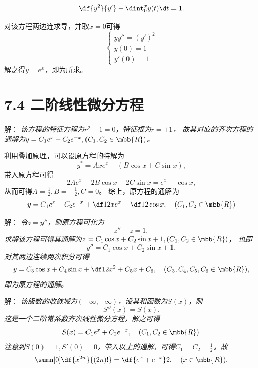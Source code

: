 \begin{frame}
	\linespread{1.5}	
	\small \it
	$$\df{y^2}{y'}-\dint_0^xy(t)\d t=1.$$
	
	对该方程两边连求导，并取$x=0$可得
	$$\left\{\begin{array}{l}
	yy''=(y')^2\\
	y(0)=1\\
	y'(0)=1
	\end{array}\right.$$
	解之得$y=e^x$，即为所求。
	\fin
\end{frame}

\section{7.4 二阶线性微分方程}

\begin{frame}
	\linespread{1.5}
	
	\bigskip
	
	\small 解：\it
	该方程的特征方程为$r^2-1=0$，特征根为$r=\pm1$，
	故其对应的齐次方程的通解为$y=C_1e^x+C_2e^{-x},(C_1,C_2\in\mbb{R})$。
	
	利用叠加原理，可以设原方程的特解为
	$$y^*=Axe^x+(B\cos x+C\sin x),$$
	带入原方程可得
	$$2Ae^x-2B\cos x-2C\sin x=e^x+\cos x,$$
	从而可得$A=\frac12,B=-\frac12,C=0$。
	综上，原方程的通解为
	$$y=C_1e^x+C_2e^{-x}+\df12xe^x-\df12\cos x,\quad (C_1,C_2\in\mbb{R})$$
\end{frame}

\begin{frame}
	\linespread{1.5}
	
	\bigskip
	
	\small 解：\it
	令$z=y''$，则原方程可化为
	$$z''+z=1,$$
	求解该方程可得其通解为$z=C_1\cos x+C_2\sin x+1,(C_1,C_2\in\mbb{R})$，
	也即
	$$y''=C_1\cos x+C_2\sin x+1,$$
	对其两边连续两次积分可得
	$$y=C_3\cos x+C_4\sin x+\df12x^2+C_5x+C_6,\quad (C_3,C_4,C_5,C_6\in\mbb{R}),$$
	即为原方程的通解。\fin
\end{frame}

\begin{frame}
	\linespread{1.5}
	
	\bigskip
	
	\small 解：\it
	该级数的收敛域为$(-\infty,+\infty)$，设其和函数为$S(x)$，则
	$$S''(x)=S(x).$$
	这是一个二阶常系数齐次线性微分方程，解之可得
	$$S(x)=C_1e^x+C_2e^{-x},\quad(C_1,C_2\in\mbb{R}).$$
	注意到$S(0)=1,S'(0)=0$，带入以上的通解，可得$C_1=C_2=\frac12$，故
	$$\sumn[0]\df{x^{2n}}{(2n)!}=\df{e^x+e^{-x}}2,\quad(x\in\mbb{R}).$$
	\fin
\end{frame}

